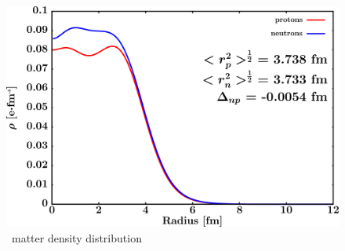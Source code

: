 \begin{figure}[hbtp]
    \centering
    \begin{minipage}{0.70\textwidth}
        \centering
        \includegraphics[width=\linewidth]{figures/ni58_matterDensity.png}
        \caption*{\niEight\ matter density distribution}
        \label{DOMFitData_ni58_matterDensity}
    \end{minipage}
\end{figure}

